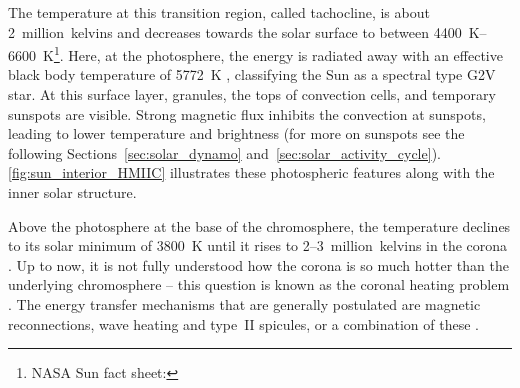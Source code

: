 The temperature at this transition region, called tachocline, is about 2~million~kelvins and decreases towards the solar surface to between \SIrange{4400}{6600}{\K}\footnote{NASA Sun fact sheet: }. Here, at the photosphere, the energy is radiated away with an effective black body temperature of \SI{5772}{\K} \citep{Prsa2016}, classifying the Sun as a spectral type G2V star.
At this surface layer, granules, the tops of convection cells, and temporary sunspots are visible. Strong magnetic flux inhibits the convection at sunspots, leading to lower temperature and brightness (for more on sunspots see the following Sections~\ref{sec:solar_dynamo} and~\ref{sec:solar_activity_cycle}). \autoref{fig:sun_interior_HMIIC} illustrates these photospheric features along with the inner solar structure.
\begin{figure}[htb]
\end{figure}

Above the photosphere at the base of the chromosphere, the temperature declines to its solar minimum of \SI{3800}{\K} until it rises to \numrange{2}{3}~million~kelvins in the corona \citep{Billings1959,Liebenberg1975}. Up to now, it is not fully understood how the corona is so much hotter than the underlying chromosphere -- this question is known as the coronal heating problem \citep{Klimchuk2006,McComas2007,Fox2015}. The energy transfer mechanisms that are generally postulated are magnetic reconnections, wave heating and type~II spicules, or a combination of these \citep{Cranmer2017}.

